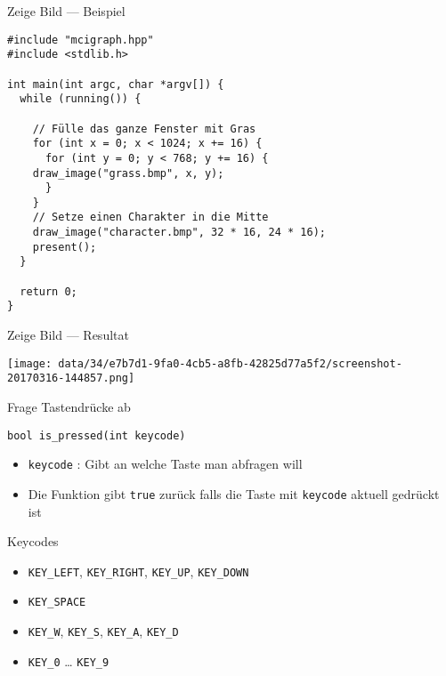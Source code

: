 \documentclass[presentation]{beamer}
\begin{document}
\begin{frame}[label={sec:org78861af},fragile]{Zeige Bild --- Beispiel}
 \begin{verbatim}
#include "mcigraph.hpp"
#include <stdlib.h>

int main(int argc, char *argv[]) {
  while (running()) {

    // Fülle das ganze Fenster mit Gras
    for (int x = 0; x < 1024; x += 16) {
      for (int y = 0; y < 768; y += 16) {
	draw_image("grass.bmp", x, y);
      }
    }
    // Setze einen Charakter in die Mitte
    draw_image("character.bmp", 32 * 16, 24 * 16);
    present();
  }

  return 0;
}
\end{verbatim}
\end{frame}
\begin{frame}[label={sec:orgc941c5f}]{Zeige Bild --- Resultat}
\begin{center}
\texttt{[image: data/34/e7b7d1-9fa0-4cb5-a8fb-42825d77a5f2/screenshot-20170316-144857.png]}
\end{center}
\end{frame}
\begin{frame}[label={sec:org589f7f5},fragile]{Frage Tastendrücke ab}
 \begin{verbatim}
bool is_pressed(int keycode)
\end{verbatim}
\begin{itemize}
\item {\color{solarizedYellow}\verb!keycode!} : Gibt an welche Taste man abfragen will
\item Die Funktion gibt {\color{solarizedYellow}\verb!true!} zurück falls die Taste mit {\color{solarizedYellow}\verb!keycode!}
aktuell gedrückt ist
\end{itemize}
\begin{block}{Keycodes}
\begin{itemize}
\item {\color{solarizedYellow}\verb!KEY_LEFT!}, {\color{solarizedYellow}\verb!KEY_RIGHT!}, {\color{solarizedYellow}\verb!KEY_UP!}, {\color{solarizedYellow}\verb!KEY_DOWN!}
\item {\color{solarizedYellow}\verb!KEY_SPACE!}
\item {\color{solarizedYellow}\verb!KEY_W!}, {\color{solarizedYellow}\verb!KEY_S!}, {\color{solarizedYellow}\verb!KEY_A!}, {\color{solarizedYellow}\verb!KEY_D!}
\item {\color{solarizedYellow}\verb!KEY_0!} \ldots{} {\color{solarizedYellow}\verb!KEY_9!}
\end{itemize}
\end{block}
\end{frame}
\end{document}
